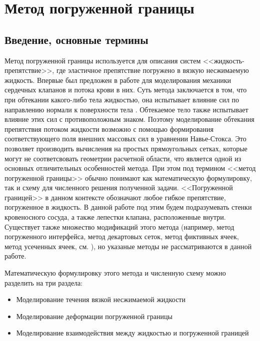 \section*{\Large Метод погруженной границы}
\fontsize{14pt}{15pt}\selectfont
\subsection*{Введение, основные термины}
Метод погруженной границы используется для описания систем <<жидкость-препятствие>>,
где эластичное препятствие погружено в вязкую несжимаемую жидкость.
Впервые был предложен в работе \cite{peskin1972flow} для моделирования механики
сердечных клапанов и потока крови в них.
Суть метода заключается в том, что при обтекании какого-либо тела жидкостью,
она испытывает влияние сил по направлению нормали к поверхности тела \cite{goldstein1993modeling}.
Обтекаемое тело также испытывает влияние этих сил с противоположным знаком.
Поэтому моделирование обтекания препятствия потоком жидкости возможно
с помощью формирования соответствующего поля внешних массовых сил в уравнении Навье-Стокса.
Это позволяет производить вычисления на простых прямоугольных сетках, которые могут не соответсвовать
геометрии расчетной области, что является одной из основных отличительных особенностей метода.
При этом под термином <<метод погруженной границы>> обычно понимают как математическую формулировку,
так и схему для численного решения полученной задачи. <<Погруженной границей>> в данном контексте
обозначают любое гибкое препятствие, погруженное в жидкость. В данной работе под этим будем подразумевать
стенки кровеносного сосуда, а также лепестки клапана, расположенные внутри.
Существует также множество модификаций этого метода (например, метод погруженного интерфейса,
метод декартовых сеток, метод фиктивных ячеек, метод усеченных ячеек, см. \cite{mittal2005immersed}),
но указаные методы не рассматриваются в данной работе.

Математическую формулировку этого метода и численную схему можно разделить на три раздела:
\begin{itemize}
    \item Моделирование течения вязкой несжимаемой жидкости
    \item Моделирование деформации погруженной границы
    \item Моделирование взаимодействия между жидкостью и погруженной границей
\end{itemize}

